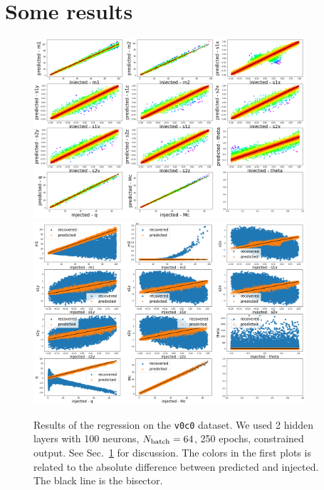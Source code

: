 \documentclass[prd,aps,twocolumn,a4paper,showkeys,nofootinbib]{article}
\begin{document}
\section{Some results}
\label{sec:some_results}
%
\begin{figure}[]
  \center
  \includegraphics[width=0.9\textwidth]{./Figs/v0c0_regression.png}
  \includegraphics[width=0.9\textwidth]{./Figs/v0c0_regression_noise.png}
  \caption{\label{fig:v0c0_results} Results of the regression on the \texttt{v0c0}
  dataset. We used 2 hidden layers with 100 neurons, $N_{\rm batch}=64$, 250 epochs,  
  constrained output. See Sec.~\ref{sec:some_results} for discussion. 
  The colors in the first plots is related to the absolute difference between predicted 
  and injected. The black line is the bisector.}
\end{figure}
%
\end{document}
